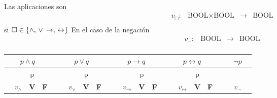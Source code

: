 \paragraph{}
Las aplicaciones son
\[ \begin{matrix}
v_{\Box}: & \mbox{BOOL}\times \mbox{BOOL} & \rightarrow &\mbox{BOOL}\\
\end{matrix} \]
si $\Box \in \{ \wedge, \, \lor \, \rightarrow, \, \leftrightarrow \}$
En el caso de la negación
\[ \begin{matrix}
v_{\neg}: & \mbox{BOOL} & \rightarrow &\mbox{BOOL}\\
\end{matrix} \]
\begin{table}[]
\centering
\begin{tabular}{ccccc|ccccc|ccccc|ccccc|ccc}
\multicolumn{4}{c}{$p \wedge q$}                                                                      &  & \multicolumn{4}{c}{$p \lor q$}                                                                      &  & \multicolumn{4}{c}{$p \rightarrow q$}                                                                     &  & \multicolumn{4}{c}{$p \leftrightarrow q$}                                                                     &  & \multicolumn{3}{c}{$\neg p$}                                                 \\ \hline
                                        &                                   & p          &            &  &                                         &                                 & p          &            &  &                                         &                                        & p          &            &  &                                         &                                            & p          &            &  &                                         &                                 &   \\ \cline{3-4} \cline{8-9} \cline{13-14} \cline{18-19}
                                        & \multicolumn{1}{c|}{$v_{\wedge}$} & \textbf{V} & \textbf{F} &  &                                         & \multicolumn{1}{c|}{$v_{\lor}$} & \textbf{V} & \textbf{F} &  &                                         & \multicolumn{1}{c|}{$v_{\rightarrow}$} & \textbf{V} & \textbf{F} &  &                                         & \multicolumn{1}{c|}{$v_{\leftrightarrow}$} & \textbf{V} & \textbf{F} &  &                                         & \multicolumn{1}{c|}{$v_{\neg}$} &   \\ \cline{2-4} \cline{7-9} \cline{12-14} \cline{17-19} \cline{22-23} 

\end{tabular}
\end{table}
